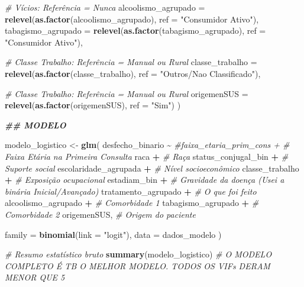 \documentclass[
]{article}
\newenvironment{Shaded}{\begin{snugshade}}{\end{snugshade}}
\newcommand{\AttributeTok}[1]{\textcolor[rgb]{0.13,0.29,0.53}{#1}}
\newcommand{\CommentTok}[1]{\textcolor[rgb]{0.56,0.35,0.01}{\textit{#1}}}
\newcommand{\DocumentationTok}[1]{\textcolor[rgb]{0.56,0.35,0.01}{\textbf{\textit{#1}}}}
\newcommand{\FunctionTok}[1]{\textcolor[rgb]{0.13,0.29,0.53}{\textbf{#1}}}
\newcommand{\NormalTok}[1]{#1}
\newcommand{\OtherTok}[1]{\textcolor[rgb]{0.56,0.35,0.01}{#1}}
\newcommand{\SpecialCharTok}[1]{\textcolor[rgb]{0.81,0.36,0.00}{\textbf{#1}}}
\newcommand{\StringTok}[1]{\textcolor[rgb]{0.31,0.60,0.02}{#1}}
\begin{document}
\begin{Shaded}
\begin{Highlighting}[]
    \CommentTok{\# Vícios: Referência = Nunca}
    \AttributeTok{alcoolismo\_agrupado =} \FunctionTok{relevel}\NormalTok{(}\FunctionTok{as.factor}\NormalTok{(alcoolismo\_agrupado), }\AttributeTok{ref =} \StringTok{"Consumidor Ativo"}\NormalTok{),}
    \AttributeTok{tabagismo\_agrupado =} \FunctionTok{relevel}\NormalTok{(}\FunctionTok{as.factor}\NormalTok{(tabagismo\_agrupado), }\AttributeTok{ref =} \StringTok{"Consumidor Ativo"}\NormalTok{),}
    
    \CommentTok{\# Classe Trabalho: Referência = Manual ou Rural}
    \AttributeTok{classe\_trabalho =} \FunctionTok{relevel}\NormalTok{(}\FunctionTok{as.factor}\NormalTok{(classe\_trabalho), }\AttributeTok{ref =} \StringTok{"Outros/Nao Classificado"}\NormalTok{),}
    
    \CommentTok{\# Classe Trabalho: Referência = Manual ou Rural}
    \AttributeTok{origemenSUS =} \FunctionTok{relevel}\NormalTok{(}\FunctionTok{as.factor}\NormalTok{(origemenSUS), }\AttributeTok{ref =} \StringTok{"Sim"}\NormalTok{)}
\NormalTok{  )}

\DocumentationTok{\#\# MODELO }

\NormalTok{modelo\_logistico }\OtherTok{\textless{}{-}} \FunctionTok{glm}\NormalTok{(}
\NormalTok{  desfecho\_binario }\SpecialCharTok{\textasciitilde{}} 
    \CommentTok{\#faixa\_etaria\_prim\_cons +   \# Faixa Etária na Primeira Consulta}
\NormalTok{    raca }\SpecialCharTok{+}                \CommentTok{\# Raça}
\NormalTok{    status\_conjugal\_bin }\SpecialCharTok{+}      \CommentTok{\# Suporte social}
\NormalTok{    escolaridade\_agrupada }\SpecialCharTok{+}    \CommentTok{\# Nível socioeconômico}
\NormalTok{    classe\_trabalho }\SpecialCharTok{+}          \CommentTok{\# Exposição ocupacional}
\NormalTok{    estadiam\_bin }\SpecialCharTok{+}             \CommentTok{\# Gravidade da doença (Usei a binária Inicial/Avançado)}
\NormalTok{    tratamento\_agrupado }\SpecialCharTok{+}      \CommentTok{\# O que foi feito}
\NormalTok{    alcoolismo\_agrupado }\SpecialCharTok{+}      \CommentTok{\# Comorbidade 1}
\NormalTok{    tabagismo\_agrupado }\SpecialCharTok{+}       \CommentTok{\# Comorbidade 2}
\NormalTok{    origemenSUS,               }\CommentTok{\# Origem do paciente}
  
  \AttributeTok{family =} \FunctionTok{binomial}\NormalTok{(}\AttributeTok{link =} \StringTok{"logit"}\NormalTok{),}
  \AttributeTok{data =}\NormalTok{ dados\_modelo}
\NormalTok{)}

\CommentTok{\# Resumo estatístico bruto}
\FunctionTok{summary}\NormalTok{(modelo\_logistico) }\CommentTok{\# O MODELO COMPLETO É TB O MELHOR MODELO. TODOS OS VIFs DERAM MENOR QUE 5}
\end{Highlighting}
\end{Shaded}
\end{document}
